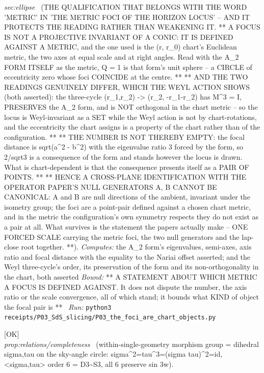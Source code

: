 \begin{description}
\textit{sec:ellipse} \ (THE QUALIFICATION THAT BELONGS WITH THE WORD 'METRIC' IN 'THE METRIC FOCI OF THE HORIZON LOCUS' -- AND IT PROTECTS THE READING RATHER THAN WEAKENING IT. ** A FOCUS IS NOT A PROJECTIVE INVARIANT OF A CONIC: IT IS DEFINED AGAINST A METRIC, and the one used is the (r, r\_0) chart's Euclidean metric, the two axes at equal scale and at right angles. Read with the A\_2 FORM ITSELF as the metric, Q = 1 is that form's unit sphere -- a CIRCLE of eccentricity zero whose foci COINCIDE at the centre. ** ** AND THE TWO READINGS GENUINELY DIFFER, WHICH THE WEYL ACTION SHOWS (both asserted): the three-cycle (r\_1,r\_2) -> (r\_2, -r\_1-r\_2) has M\textasciicircum{}3 = I, PRESERVES the A\_2 form, and is NOT orthogonal in the chart metric -- so the locus is Weyl-invariant as a SET while the Weyl action is not by chart-rotations, and the eccentricity the chart assigns is a property of the chart rather than of the configuration. ** ** THE NUMBER IS NOT THEREBY EMPTY: the focal distance is sqrt(a\textasciicircum{}2 - b\textasciicircum{}2) with the eigenvalue ratio 3 forced by the form, so 2/sqrt3 is a consequence of the form and stands however the locus is drawn. What is chart-dependent is that the consequence presents itself as a PAIR OF POINTS. ** ** HENCE A CROSS-PLANE IDENTIFICATION WITH THE OPERATOR PAPER'S NULL GENERATORS A, B CANNOT BE CANONICAL: A and B are null directions of the ambient, invariant under the isometry group; the foci are a point-pair defined against a chosen chart metric, and in the metric the configuration's own symmetry respects they do not exist as a pair at all. What survives is the statement the papers actually make -- ONE FORCED SCALE carrying the metric foci, the two null generators and the lap-close root together. **). 
\emph{Computes:} the A\_2 form's eigenvalues, semi-axes, axis ratio and focal distance with the equality to the Nariai offset asserted; and the Weyl three-cycle's order, its preservation of the form and its non-orthogonality in the chart, both asserted
 \emph{Bound:} ** A STATEMENT ABOUT WHICH METRIC A FOCUS IS DEFINED AGAINST. It does not dispute the number, the axis ratio or the scale convergence, all of which stand; it bounds what KIND of object the focal pair is **
\ \emph{Run:} \texttt{python3 receipts/P03\_SdS\_slicing/P03\_the\_foci\_are\_chart\_objects.py}
\item[\label{rcpt:P05_dihedral_generators}\texttt{P05\_dihedral\_generators}]\hfill\textsf{[OK]}\\
\textit{prop:relations/completeness} \ (within-single-geometry morphism group = dihedral sigma,tau on the sky-angle circle: sigma\textasciicircum{}2=tau\textasciicircum{}3=(sigma tau)\textasciicircum{}2=id, <sigma,tau> order 6 = D3\textasciitilde{}S3, all 6 preserve sin 3w). 

\end{description}
